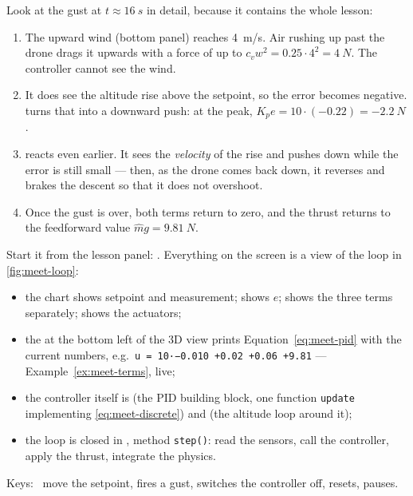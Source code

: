 Look at the gust at $t \approx \SI{16}{s}$ in detail, because it contains the whole lesson:
\begin{enumerate}
  \item The upward wind (bottom panel) reaches \SI{4}{m/s}. Air rushing up past the drone drags it upwards with a force of up to $c_v w^2 = 0.25 \cdot 4^2 = \SI{4}{N}$. The controller cannot see the wind.
  \item It does see the altitude rise above the setpoint, so the error becomes negative. \Pt turns that into a downward push: at the peak, $K_p e = 10 \cdot (-0.22) = \SI{-2.2}{N}$.
  \item \Dt reacts even earlier. It sees the \emph{velocity} of the rise and pushes down while the error is still small — then, as the drone comes back down, it reverses and brakes the descent so that it does not overshoot.
  \item Once the gust is over, both terms return to zero, and the thrust returns to the feedforward value $\hat m g = \SI{9.81}{N}$.
\end{enumerate}

\begin{inapp}
Start it from the lesson panel: . Everything on the screen is a view of the loop in \cref{fig:meet-loop}:
\begin{itemize}[leftmargin=1.2em]
  \item the  chart shows setpoint and measurement;  shows $e$;  shows the three terms separately;  shows the actuators;
  \item the  at the bottom left of the 3D view prints Equation~\eqref{eq:meet-pid} with the current numbers, e.g.\ \texttt{u = 10·−0.010 +0.02 +0.06 +9.81} — Example~\ref{ex:meet-terms}, live;
  \item the controller itself is  (the PID building block, one function \texttt{update} implementing \cref{eq:meet-discrete}) and  (the altitude loop around it);
  \item the loop is closed in , method \texttt{step()}: read the sensors, call the controller, apply the thrust, integrate the physics.
\end{itemize}
Keys: \, move the setpoint,  fires a gust,  switches the controller off,  resets,  pauses.
\end{inapp}

